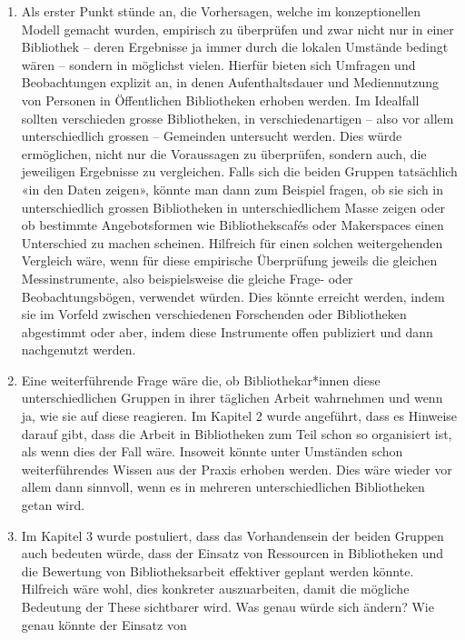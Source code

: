 \documentclass[a4paper,
fontsize=11pt,
oneside,
numbers=noperiodatend,
parskip=half-,
bibliography=totoc,
final
]{scrartcl}
\begin{document}
\pagebreak

\begin{enumerate}
\def\labelenumi{\arabic{enumi}.}
\item
  Als erster Punkt stünde an, die Vorhersagen, welche im konzeptionellen
  Modell gemacht wurden, empirisch zu überprüfen und zwar nicht nur in
  einer Bibliothek -- deren Ergebnisse ja immer durch die lokalen
  Umstände bedingt wären -- sondern in möglichst vielen. Hierfür bieten
  sich Umfragen und Beobachtungen explizit an, in denen Aufenthaltsdauer
  und Mediennutzung von Personen in Öffentlichen Bibliotheken erhoben
  werden. Im Idealfall sollten verschieden grosse Bibliotheken, in
  verschiedenartigen -- also vor allem unterschiedlich grossen --
  Gemeinden untersucht werden. Dies würde ermöglichen, nicht nur die
  Voraussagen zu überprüfen, sondern auch, die jeweiligen Ergebnisse zu
  vergleichen. Falls sich die beiden Gruppen tatsächlich «in den Daten
  zeigen», könnte man dann zum Beispiel fragen, ob sie sich in
  unterschiedlich grossen Bibliotheken in unterschiedlichem Masse zeigen
  oder ob bestimmte Angebotsformen wie Bibliothekscafés oder Makerspaces
  einen Unterschied zu machen scheinen. Hilfreich für einen solchen
  weitergehenden Vergleich wäre, wenn für diese empirische Überprüfung
  jeweils die gleichen Messinstrumente, also beispielsweise die gleiche
  Frage- oder Beobachtungsbögen, verwendet würden. Dies könnte erreicht
  werden, indem sie im Vorfeld zwischen verschiedenen Forschenden oder
  Bibliotheken abgestimmt oder aber, indem diese Instrumente offen
  publiziert und dann nachgenutzt werden.
\item
  Eine weiterführende Frage wäre die, ob Bibliothekar*innen diese
  unterschiedlichen Gruppen in ihrer täglichen Arbeit wahrnehmen und
  wenn ja, wie sie auf diese reagieren. Im Kapitel 2 wurde angeführt,
  dass es Hinweise darauf gibt, dass die Arbeit in Bibliotheken zum Teil
  schon so organisiert ist, als wenn dies der Fall wäre. Insoweit könnte
  unter Umständen schon weiterführendes Wissen aus der Praxis erhoben
  werden. Dies wäre wieder vor allem dann sinnvoll, wenn es in mehreren
  unterschiedlichen Bibliotheken getan wird.
\item
  Im Kapitel 3 wurde postuliert, dass das Vorhandensein der beiden
  Gruppen auch bedeuten würde, dass der Einsatz von Ressourcen in
  Bibliotheken und die Bewertung von Bibliotheksarbeit effektiver
  geplant werden könnte. Hilfreich wäre wohl, dies konkreter
  auszuarbeiten, damit die mögliche Bedeutung der These sichtbarer wird.
  Was genau würde sich ändern? Wie genau könnte der Einsatz von

\end{enumerate}
\end{document}
